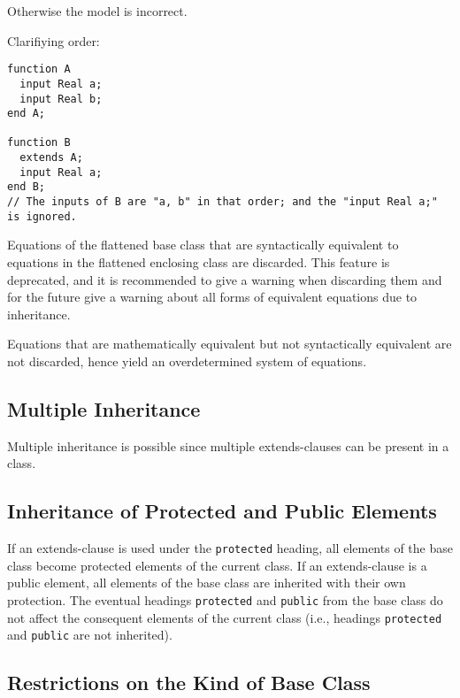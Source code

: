 Otherwise the model is incorrect.

\begin{nonnormative}
Clarifiying order:
\begin{lstlisting}[language=modelica]
function A
  input Real a;
  input Real b;
end A;

function B
  extends A;
  input Real a;
end B;
// The inputs of B are "a, b" in that order; and the "input Real a;" is ignored.
\end{lstlisting}
\end{nonnormative}

Equations of the flattened base class that are syntactically equivalent
to equations in the flattened enclosing class are discarded. This
feature is deprecated, and it is recommended to give a warning when
discarding them and for the future give a warning about all forms of
equivalent equations due to inheritance.

\begin{nonnormative}
Equations that are mathematically equivalent but not syntactically equivalent are not discarded, hence yield an overdetermined system of equations.
\end{nonnormative}

\subsection{Multiple Inheritance}\label{multiple-inheritance}

Multiple inheritance is possible since multiple extends-clauses can be
present in a class.

\subsection{Inheritance of Protected and Public Elements}\label{inheritance-of-protected-and-public-elements}

If an extends-clause is used under the \lstinline!protected! heading, all elements
of the base class become protected elements of the current class. If an
extends-clause is a public element, all elements of the base class are
inherited with their own protection. The eventual headings \lstinline!protected! and
\lstinline!public! from the base class do not affect the consequent elements of the
current class (i.e., headings \lstinline!protected! and \lstinline!public! are not inherited).

\subsection{Restrictions on the Kind of Base Class}\label{restrictions-on-the-kind-of-base-class}

